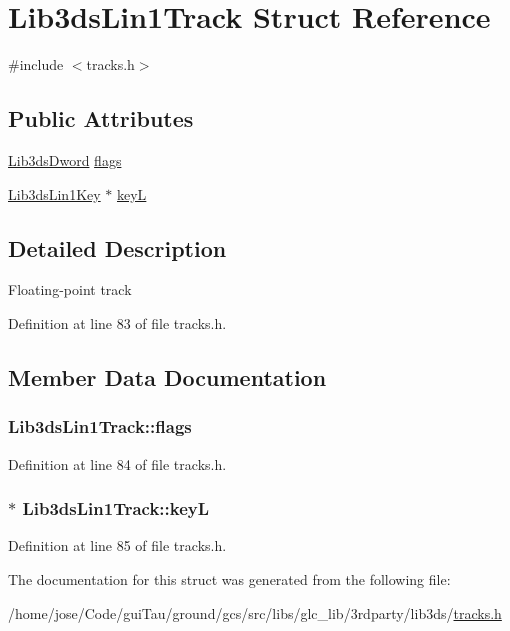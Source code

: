 \hypertarget{struct_lib3ds_lin1_track}{\section{Lib3ds\-Lin1\-Track Struct Reference}
\label{struct_lib3ds_lin1_track}
}


{\ttfamily \#include $<$tracks.\-h$>$}

\subsection*{Public Attributes}
\begin{DoxyCompactItemize}
\item 
\hyperlink{types_8h_a299c9663303144c562f6bd92c2f273d3}{Lib3ds\-Dword} \hyperlink{struct_lib3ds_lin1_track_abe43528e62a70afbe7e4f3b20a050d11}{flags}
\item 
\hyperlink{struct_lib3ds_lin1_key}{Lib3ds\-Lin1\-Key} $\ast$ \hyperlink{struct_lib3ds_lin1_track_aa27412c084ddf0aa81329a2acb56c1f4}{key\-L}
\end{DoxyCompactItemize}


\subsection{Detailed Description}
Floating-\/point track 

Definition at line 83 of file tracks.\-h.



\subsection{Member Data Documentation}
\hypertarget{struct_lib3ds_lin1_track_abe43528e62a70afbe7e4f3b20a050d11}{
\subsubsection[{flags}]{ Lib3ds\-Lin1\-Track\-::flags}}\label{struct_lib3ds_lin1_track_abe43528e62a70afbe7e4f3b20a050d11}


Definition at line 84 of file tracks.\-h.

\hypertarget{struct_lib3ds_lin1_track_aa27412c084ddf0aa81329a2acb56c1f4}{
\subsubsection[{key\-L}]{$\ast$ Lib3ds\-Lin1\-Track\-::key\-L}}\label{struct_lib3ds_lin1_track_aa27412c084ddf0aa81329a2acb56c1f4}


Definition at line 85 of file tracks.\-h.



The documentation for this struct was generated from the following file\-:\begin{DoxyCompactItemize}
\item 
/home/jose/\-Code/gui\-Tau/ground/gcs/src/libs/glc\-\_\-lib/3rdparty/lib3ds/\hyperlink{tracks_8h}{tracks.\-h}\end{DoxyCompactItemize}
